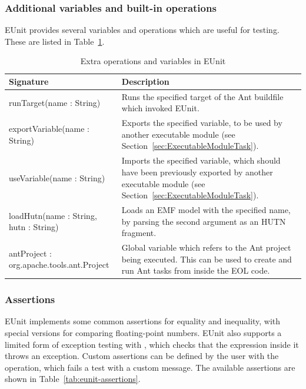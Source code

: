 \subsubsection{Additional variables and built-in operations}

EUnit provides several variables and operations which are useful for testing. These are listed in Table~\ref{tab:eunit-operations}.

\begin{table}
  \begin{tabular}{|p{6cm}|p{6.5cm}|}
    \hline \textbf{Signature} & \textbf{Description}  \\\hline

    runTarget(name : String)      & Runs the specified target of the Ant buildfile which invoked EUnit. \\\hline

    exportVariable(name : String) & Exports the specified variable, to be used by another executable module (see Section~\ref{sec:ExecutableModuleTask}). \\\hline

    useVariable(name : String) & Imports the specified variable, which should have been previously exported by another executable module (see Section~\ref{sec:ExecutableModuleTask}). \\\hline

    loadHutn(name : String, hutn : String) & Loads an EMF model with the specified name, by parsing the second argument as an HUTN~\cite{HUTN} fragment. \\\hline

    antProject : org.apache.tools.ant.Project & Global variable which refers to the Ant project being executed. This can be used to create and run Ant tasks from inside the EOL code. \\\hline
  \end{tabular}
  \caption{Extra operations and variables in EUnit}
  \label{tab:eunit-operations}
\end{table}

\subsubsection{Assertions}

EUnit implements some common assertions for equality and inequality, with special versions for comparing floating-point numbers. EUnit also supports a limited form of exception testing with , which checks that the expression inside it throws an exception. Custom assertions can be defined by the user with the  operation, which fails a test with a custom message. The available assertions are shown in Table~\ref{tab:eunit-assertions}.


